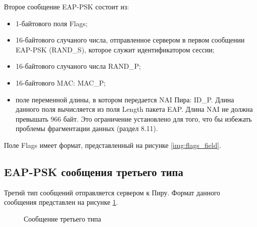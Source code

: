 Второе сообщение EAP-PSK состоит из:

\begin{itemize}
\item 1-байтового поля Flags;
\item 16-байтового случаного числа, отправленное сервером в первом сообщении EAP-PSK (RAND\_S), которое служит идентификатором сессии;
\item 16-байтового случаного числа RAND\_P;
\item 16-байтового MAC: MAC\_P;
\item поле переменной длины, в котором передается NAI Пира: ID\_P. Длина данного поля вычисляется из поля Length пакета EAP. Длина NAI не должна превышать 966 байт. Это ограничение установлено для того, что бы избежать проблемы фрагментации данных (раздел 8.11).
\end{itemize}

Поле Flags имеет формат, представленный на рисунке \ref{img:flags_field}.

\subsection{EAP-PSK сообщения третьего типа}

Третий тип сообщений отправляется сервером к Пиру. Формат данного сообщения представлен на рисунке \ref{img:message_type3}.

\begin{figure}[h!]
\caption{Сообщение третьего типа}
\label{img:message_type3}
\end{figure}
